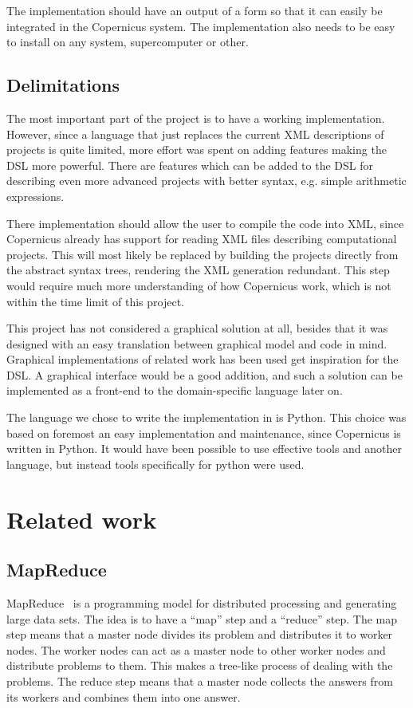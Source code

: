 The implementation should have an output of a form so that it can
easily be integrated in the Copernicus system. The implementation
also needs to be easy to install on any system, supercomputer or
other.

\subsection{Delimitations}
The most important part of the project is to have a working
implementation. However, since a language that just replaces the
current XML descriptions of projects is quite limited, more effort was
spent on adding features making the DSL more powerful. There are
features which can be added to the DSL for describing even more
advanced projects with better syntax, e.g. simple arithmetic expressions.

There implementation should allow the user to compile the code into
XML, since Copernicus already has support for reading XML files
describing computational projects. This will most likely be replaced
by building the projects directly from the abstract syntax trees,
rendering the XML generation redundant. This step would require much
more understanding of how Copernicus work, which is not within the
time limit of this project.

This project has not considered a graphical solution at all, besides
that it was designed with an easy translation between graphical model
and code in mind. Graphical implementations of related work has been
used get inspiration for the DSL. A graphical interface would be a
good addition, and such a solution can be implemented as a front-end
to the domain-specific language later on.

The language we chose to write the implementation in is Python. This
choice was based on foremost an easy implementation and maintenance,
since Copernicus is written in Python. It would have been possible to
use effective tools and another language, but instead tools
specifically for python were used.


\section{Related work}

\subsection{MapReduce}
MapReduce~\cite{dean:2008} is a programming model for distributed
processing and generating large data sets. The idea is to have a
``map'' step and a ``reduce'' step. The map step means that a master
node divides its problem and distributes it to worker nodes. The
worker nodes can act as a master node to other worker nodes and
distribute problems to them. This makes a tree-like process of dealing
with the problems. The reduce step means that a master node collects
the answers from its workers and combines them into one answer.

